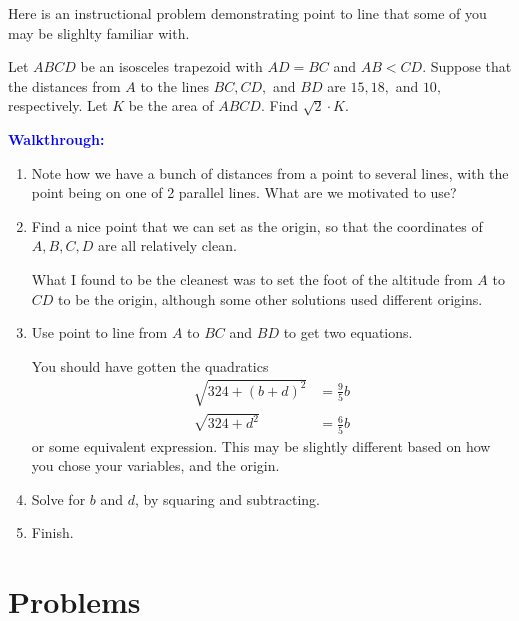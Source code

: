 \documentclass{article}
\begin{document}
Here is an instructional problem demonstrating point to line that some of you may be slighlty familiar with. 
\begin{exam}
Let $ABCD$ be an isosceles trapezoid with $AD=BC$ and $AB<CD.$ Suppose that the distances from $A$ to the lines $BC,CD,$ and $BD$ are $15,18,$ and $10,$ respectively. Let $K$ be the area of $ABCD.$ Find $\sqrt2 \cdot K.$
\end{exam}
\textcolor{Blue}{\textbf{Walkthrough:}}
\begin{enumerate}[label=(\alph*)]
    \item Note how we have a bunch of distances from a point to several lines, with the point being on one of 2 parallel lines. What are we motivated to use?
    \item Find a nice point that we can set as the origin, so that the coordinates of $A,B,C,D$ are all relatively clean.
    
    What I found to be the cleanest was to set the foot of the altitude from $A$ to $CD$ to be the origin, although some other solutions used different origins. 
    
    \item Use point to line from $A$ to $BC$ and $BD$ to get two equations.
    
    You should have gotten the quadratics 
    \begin{align*}
        \sqrt{324+(b+d)^2}&=\frac{9}{5}b\\
        \sqrt{324+d^2}&=\frac{6}{5}b
    \end{align*}
    or some equivalent expression. This may be slightly different based on how you chose your variables, and the origin. 
    \item Solve for $b$ and $d$, by squaring and subtracting. 
    \item Finish. 
\end{enumerate}

\newpage
\section{Problems}



\end{document}
